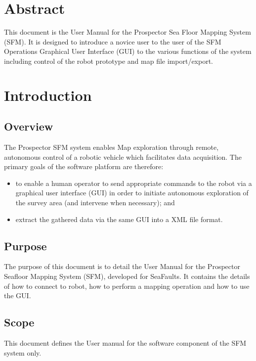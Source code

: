 \documentclass[12pt]{article}
\begin{document}
\clearpage 

\pagebreak
\tableofcontents
\pagebreak

\section{Abstract}
This document is the User Manual for the Prospector Sea Floor Mapping System (SFM). It is designed to introduce a novice user to the user of the SFM Operations Graphical User Interface (GUI) to the various functions of the system including control of the robot prototype and map file import/export.

\section{Introduction}
\subsection{Overview}
 
The Prospector SFM system enables Map exploration through remote, autonomous control of a robotic vehicle which facilitates data acquisition. The primary goals of the software platform are therefore:
\begin{itemize}
\item to enable a human operator to send appropriate commands to the robot via a graphical user interface (GUI) in order to initiate autonomous exploration of the survey area (and intervene when necessary); and 
\item extract the gathered data via the same GUI into a XML file format.
\end{itemize}

\subsection{Purpose}

The purpose of this document is to detail the User Manual for the Prospector Seafloor Mapping System (SFM), developed for SeaFaults. It contains the details of how to connect to robot, how to perform a mapping operation and how to use the GUI.
\subsection{Scope}

This document defines the User manual  for the software component
of the SFM system only.
\end{document}
